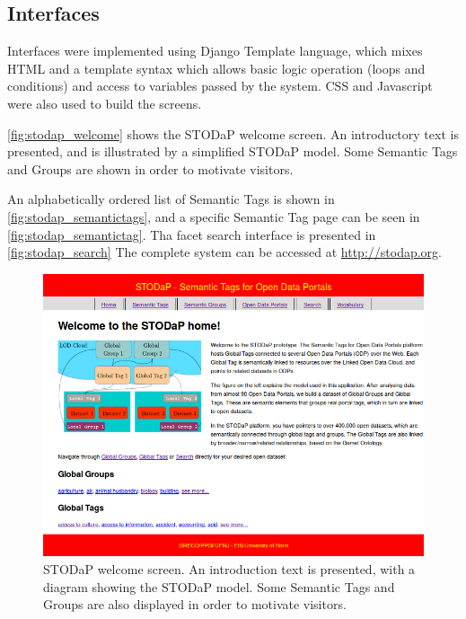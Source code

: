 	

\subsection{Interfaces}
\label{sec:implem_interface}

Interfaces were implemented using Django Template language, which mixes HTML and a template syntax which allows basic logic operation (loops and conditions) and access to variables passed by the system.
CSS and Javascript were also used to build the screens.

\autoref{fig:stodap_welcome} shows the STODaP welcome screen.
An introductory text is presented, and is illustrated by a simplified STODaP model.
Some Semantic Tags and Groups are shown in order to motivate visitors.

An alphabetically ordered list of Semantic Tags is shown in \autoref{fig:stodap_semantictags}, and a specific Semantic Tag page can be seen in \autoref{fig:stodap_semantictag}.
Tha facet search interface is presented in \autoref{fig:stodap_search}
The complete system can be accessed at \url{http://stodap.org}.

\begin{figure}[h]
\begin{center}
\includegraphics[width=\columnwidth]{images/stodapscreen_welcome.png}
\caption[STODaP welcome screen.]{STODaP welcome screen. An introduction text is presented, with a diagram showing the STODaP model. Some Semantic Tags and Groups are also displayed in order to motivate visitors.}
\label{fig:stodap_welcome}
\end{center}
\end{figure}

